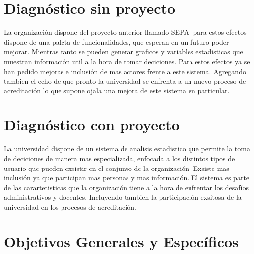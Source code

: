 \documentclass[a4paper,12pt,openany,oneside]{book}
\begin{document}
\section{Diagnóstico sin proyecto}
La organización dispone del proyecto anterior llamado SEPA, para estos efectos dispone de una paleta de funcionalidades, que esperan en un futuro poder mejorar. Mientras tanto se pueden generar graficos y variables estadisticas que muestran información util a la hora de tomar deciciones. Para estos efectos ya se han pedido mejoras e inclusión de mas actores frente a este sistema. Agregando tambien el echo de que pronto la universidad se enfrenta a un nuevo proceso de acreditación lo que supone ojala una mejora de este sistema en particular.
\section{Diagnóstico con proyecto}
La universidad dispone de un sistema de analisis estadistico que permite la toma de deciciones de manera mas especializada, enfocada a los distintos tipos de usuario que pueden exsistir en el conjunto de la organización. Exsiste mas inclusión ya que participan mas personas y mas información. El sistema  es parte de las carartetisticas que la organización tiene a la hora de enfrentar los desafíos administrativos y docentes. Incluyendo tambien la participación exsitosa de la universidad en los procesos de acreditación.
\section{Objetivos Generales y Específicos}
\end{document}
